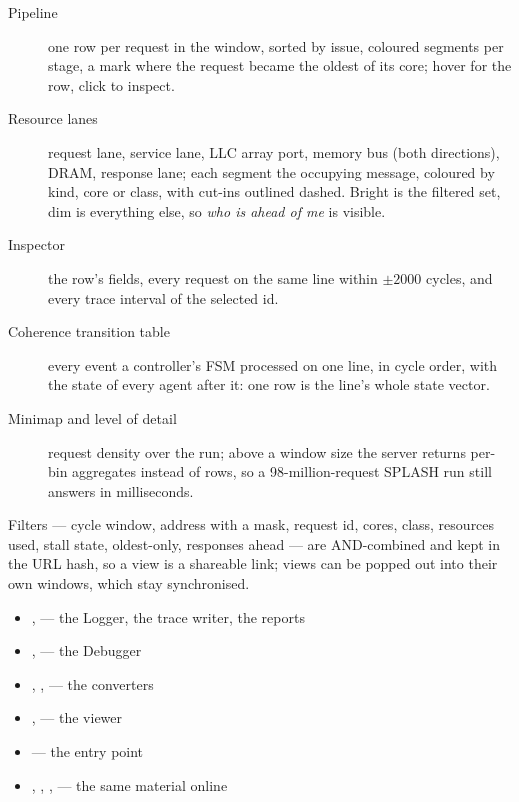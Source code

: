 \begin{description}
\item[Pipeline] one row per request in the window, sorted by issue, coloured segments per
  stage, a mark where the request became the oldest of its core; hover for the row, click to
  inspect.
\item[Resource lanes] request lane, service lane, LLC array port, memory bus (both
  directions), DRAM, response lane; each segment the occupying message, coloured by kind, core
  or class, with cut-ins outlined dashed. Bright is the filtered set, dim is everything else, so
  \emph{who is ahead of me} is visible.
\item[Inspector] the row's fields, every request on the same line within $\pm2000$ cycles, and
  every trace interval of the selected id.
\item[Coherence transition table] every event a controller's FSM processed on one line, in
  cycle order, with the state of every agent after it: one row is the line's whole state
  vector.
\item[Minimap and level of detail] request density over the run; above a window size the
  server returns per-bin aggregates instead of rows, so a 98-million-request SPLASH run still
  answers in milliseconds.
\end{description}

Filters --- cycle window, address with a mask, request id, cores, class, resources used, stall
state, oldest-only, responses ahead --- are AND-combined and kept in the URL hash, so a view is
a shareable link; views can be popped out into their own windows, which stay synchronised.

\begin{wherebox}
\begin{itemize}[nosep,leftmargin=1.2em]
\item {},  --- the Logger, the trace writer, the reports
\item {},  --- the Debugger
\item {}, ,  --- the converters
\item {},  --- the viewer
\item {} --- the entry point
\item {}, , ,  --- the same material online
\end{itemize}
\end{wherebox}
